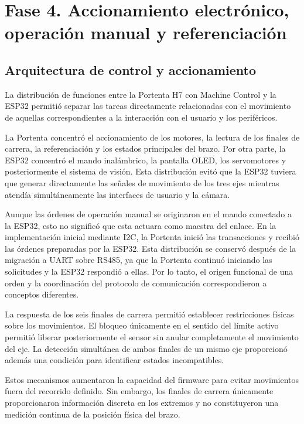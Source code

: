 
\section{Fase 4. Accionamiento electrónico, operación manual y referenciación}
\label{sec:discusion_fase4}


\subsection{Arquitectura de control y accionamiento}

La distribución de funciones entre la Portenta H7 con Machine Control y la ESP32 permitió separar las tareas directamente relacionadas con el movimiento de aquellas correspondientes a la interacción con el usuario y los periféricos.

La Portenta concentró el accionamiento de los motores, la lectura de los finales de carrera, la referenciación y los estados principales del brazo. Por otra parte, la ESP32 concentró el mando inalámbrico, la pantalla OLED, los servomotores y posteriormente el sistema de visión. Esta distribución evitó que la ESP32 tuviera que generar directamente las señales de movimiento de los tres ejes mientras atendía simultáneamente las interfaces de usuario y la cámara.

Aunque las órdenes de operación manual se originaron en el mando conectado a la ESP32, esto no significó que esta actuara como maestra del enlace. En la implementación inicial mediante I2C, la Portenta inició las transacciones y recibió las órdenes preparadas por la ESP32. Esta distribución se conservó después de la migración a UART sobre RS485, ya que la Portenta continuó iniciando las solicitudes y la ESP32 respondió a ellas. Por lo tanto, el origen funcional de una orden y la coordinación del protocolo de comunicación correspondieron a conceptos diferentes.

La respuesta de los seis finales de carrera permitió establecer restricciones físicas sobre los movimientos. El bloqueo únicamente en el sentido del límite activo permitió liberar posteriormente el sensor sin anular completamente el movimiento del eje. La detección simultánea de ambos finales de un mismo eje proporcionó además una condición para identificar estados incompatibles.

Estos mecanismos aumentaron la capacidad del firmware para evitar movimientos fuera del recorrido definido. Sin embargo, los finales de carrera únicamente proporcionaron información discreta en los extremos y no constituyeron una medición continua de la posición física del brazo.


